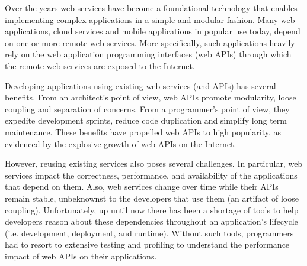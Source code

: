 Over the years web services have become a foundational technology that enables implementing
complex applications in a simple and modular fashion. Many web applications, cloud services and mobile
applications in popular use today, depend on one or more remote web services. More specifically, such
applications heavily rely on the web application programming interfaces (web APIs) through
which the remote web services are exposed to the Internet.

Developing applications using existing web services (and APIs) has several benefits. From an
architect's point of view, web APIs promote modularity, loose coupling and separation of concerns. From
a programmer's point of view, they expedite development sprints, reduce code duplication and simplify
long term maintenance. These benefits have propelled web APIs to high popularity,
as evidenced by the explosive growth of web APIs on the Internet. 

However, reusing existing services also poses several challenges. In particular, web services
impact the correctness, performance, and availability of the
applications that depend on them. Also, web services change over time while their APIs remain 
stable, unbeknownst to the developers that use them (an artifact of loose coupling).
Unfortunately, up until now there has been a shortage of tools to help developers 
reason about these dependencies throughout an application's 
lifecycle (i.e. development, deployment, and runtime).  Without such tools, 
programmers had to resort to extensive testing and profiling 
to understand the performance impact of web APIs on their applications.
